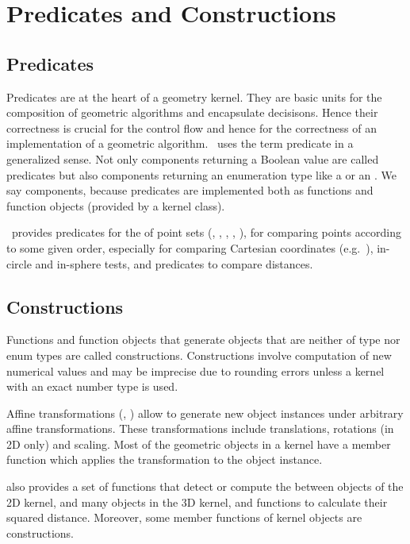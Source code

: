 \chapter{Predicates and Constructions}

\section{Predicates}
Predicates are at the heart of a geometry kernel. They are basic units
for the composition of geometric algorithms and encapsulate decisisons. 
Hence their correctness is crucial for the control flow and hence for
the correctness of an implementation of a geometric algorithm. \cgal\ uses
the term predicate in a generalized sense. Not only components returning a
Boolean value are called predicates but also components returning an 
enumeration type like a  or an .
We say components, because predicates are implemented both as functions and 
function objects (provided by a kernel class).

\cgal\ provides predicates for the  of point 
sets (, , , ,
), for comparing points according to some given order, 
especially for comparing Cartesian coordinates
(e.g.~), in-circle and in-sphere tests,
and predicates to compare distances.

\section{Constructions}
Functions and function objects that generate objects that are neither 
of type  nor enum types are called constructions.
Constructions involve computation of new numerical values and may be
imprecise due to rounding errors unless a kernel with an exact number type is 
used.

Affine transformations (, 
) allow to generate new object instances under
arbitrary affine transformations. These transformations include translations,
rotations (in 2D only) and scaling. Most of the geometric objects in a
kernel have a member function  
which applies the transformation to the object instance.

{\cgal} also provides a set of functions that detect or compute the 
between objects of the 2D kernel, and many objects in the 3D kernel,
and functions to calculate their 
squared distance. 
Moreover, some member functions of kernel objects are constructions. 

